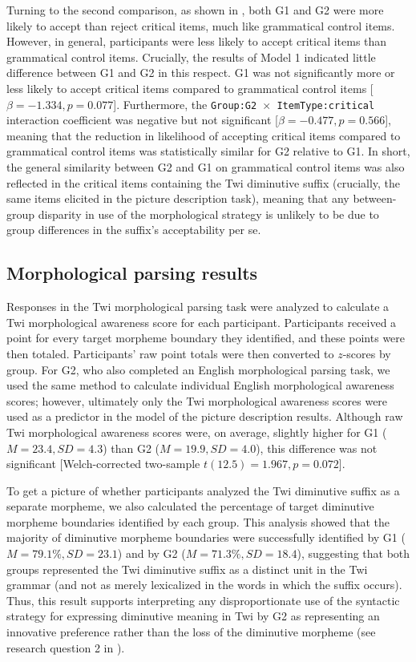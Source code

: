 \documentclass[output=paper,colorlinks,citecolor=brown]{langscibook}
\begin{document}
Turning to the second comparison, as shown in , both G1 and G2 were more likely to accept than reject critical items, much like grammatical control items. However, in general, participants were less likely to accept critical items than grammatical control items. Crucially, the results of Model 1 indicated little difference between G1 and G2 in this respect. G1 was not significantly more or less likely to accept critical items compared to grammatical control items [$\beta=-1.334,\allowbreak p=0.077$]. Furthermore, the \texttt{Group:G2 $\times$ ItemType:critical} interaction coefficient was negative but not significant [$\beta=-0.477,\allowbreak p=0.566$], meaning that the reduction in likelihood of accepting critical items compared to grammatical control items was statistically similar for G2 relative to G1. In short, the general similarity between G2 and G1 on grammatical control items was also reflected in the critical items containing the Twi diminutive suffix (crucially, the same items elicited in the picture description task), meaning that any between-group disparity in use of the morphological strategy is unlikely to be due to group differences in the suffix's acceptability per se.


\subsection{Morphological parsing results}
\label{MPTResultsSec}

Responses in the Twi morphological parsing task were analyzed to calculate a Twi morphological awareness score for each participant. Participants received a point for every target morpheme boundary they identified, and these points were then totaled. Participants' raw point totals were then converted to $z$-scores by group. For G2, who also completed an English morphological parsing task, we used the same method to calculate individual English morphological awareness scores; however, ultimately only the Twi morphological awareness scores were used as a predictor in the model of the picture description results. Although raw Twi morphological awareness scores were, on average, slightly higher for G1 ($M=23.4, SD=4.3$) than G2 ($M=19.9, SD=4.0$), this difference was not significant [Welch-corrected two-sample $t(12.5)=1.967, p=0.072$].

To get a picture of whether participants analyzed the Twi diminutive suffix as a separate morpheme, we also calculated the percentage of target diminutive morpheme boundaries identified by each group. This analysis showed that the majority of diminutive morpheme boundaries were successfully identified by G1 ($M=79.1\%, SD=23.1$) and by G2 ($M=71.3\%, SD=18.4$), suggesting that both groups represented the Twi diminutive suffix as a distinct unit in the Twi grammar (and not as merely lexicalized in the words in which the suffix occurs). Thus, this result supports interpreting any disproportionate use of the syntactic strategy for expressing diminutive meaning in Twi by G2 as representing an innovative preference rather than the loss of the diminutive morpheme (see research question 2 in ).
\end{document}
